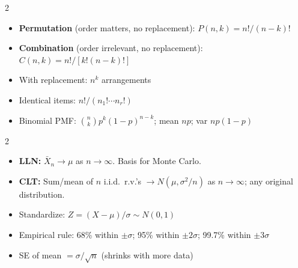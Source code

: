 \documentclass[11pt, letterpaper]{article}
\begin{document}
\vspace{4pt}

\begin{tcolorbox}[colback=partbg, colframe=sectionblue,
  title={\bfseries Combinatorics}, arc=3pt, boxrule=1pt]
\footnotesize
\begin{multicols}{2}
\begin{itemize}[noitemsep, leftmargin=*]
  \item \textbf{Permutation} (order matters, no replacement): $P(n,k) = n!/(n-k)!$
  \item \textbf{Combination} (order irrelevant, no replacement): $C(n,k) = n!/[k!(n-k)!]$
\end{itemize}
\columnbreak
\begin{itemize}[noitemsep, leftmargin=*]
  \item With replacement: $n^k$ arrangements
  \item Identical items: $n!/(n_1!\cdots n_r!)$
  \item Binomial PMF: $\binom{n}{k}p^k(1-p)^{n-k}$; mean $np$; var $np(1-p)$
\end{itemize}
\end{multicols}
\end{tcolorbox}

\vspace{4pt}

\begin{tcolorbox}[colback=part2bg, colframe=sectiongreen,
  title={\bfseries LLN, CLT \& Normal Distribution}, arc=3pt, boxrule=1pt]
\footnotesize
\begin{multicols}{2}
\begin{itemize}[noitemsep, leftmargin=*]
  \item \textbf{LLN:} $\bar{X}_n \to \mu$ as $n\to\infty$. Basis for Monte Carlo.
  \item \textbf{CLT:} Sum/mean of $n$ i.i.d.\ r.v.'s $\to N(\mu, \sigma^2/n)$ as $n\to\infty$; any original distribution.
\end{itemize}
\columnbreak
\begin{itemize}[noitemsep, leftmargin=*]
  \item Standardize: $Z = (X - \mu)/\sigma \sim N(0,1)$
  \item Empirical rule: 68\% within $\pm\sigma$; 95\% within $\pm 2\sigma$; 99.7\% within $\pm 3\sigma$
  \item SE of mean $= \sigma/\sqrt{n}$ (shrinks with more data)
\end{itemize}
\end{multicols}
\end{tcolorbox}
\end{document}
